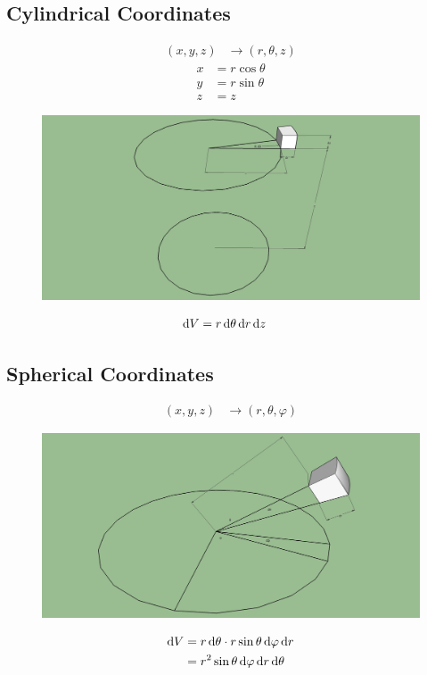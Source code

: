 \documentclass[fleqn, a4paper, 12pt]{article}
\theoremstyle{definition}
\theoremstyle{theorem}
\begin{document}
\subsection{Cylindrical Coordinates}

\begin{align*}
	(x, y, z) &\to (r, \theta, z)
\end{align*}
\begin{align*}
	x &= r \cos \theta\\
	y &= r \sin \theta\\
	z &= z
\end{align*}

\begin{figure}[h]
	\includegraphics[width=\textwidth]{CylindricalCoordinates.jpg}
\end{figure}

\begin{align*}
	\dif V &= r \dif \theta \dif r \dif z
\end{align*}

\subsection{Spherical Coordinates}

\begin{align*}
(x, y, z) &\to (r, \theta, \varphi)
\end{align*}

\begin{figure}[h]
	\includegraphics[width=\textwidth]{SphericalCoordinates.jpg}
\end{figure}

\begin{align*}
	\dif V &= r \dif \theta \cdot r \sin \theta \dif \varphi \dif r\\
	&= r^2 \sin \theta \dif \varphi \dif r \dif \theta
\end{align*}
\end{document}

